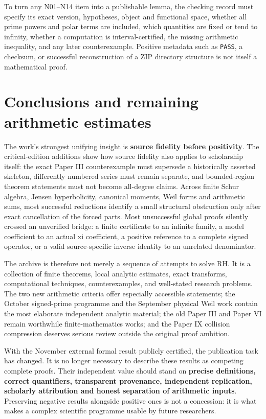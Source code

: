 \documentclass[
  10pt,
  a4paper,
  10pt,
  oneside,
  openany]{book}
\begin{document}
To turn any N01--N14 item into a publishable lemma, the checking record
must specify its exact version, hypotheses, object and functional space,
whether all prime powers and polar terms are included, which quantities
are fixed or tend to infinity, whether a computation is
interval-certified, the missing arithmetic inequality, and any later
counterexample. Positive metadata such as \texttt{PASS}, a checksum, or
successful reconstruction of a ZIP directory structure is not itself a
mathematical proof.

\section{Conclusions and remaining arithmetic
estimates}\label{conclusions-and-remaining-arithmetic-estimates}

The work's strongest unifying insight is \textbf{source fidelity before
positivity}. The critical-edition additions show how source fidelity
also applies to scholarship itself: the exact Paper III counterexample
must supersede a historically asserted skeleton, differently numbered
series must remain separate, and bounded-region theorem statements must
not become all-degree claims. Across finite Schur algebra, Jensen
hyperbolicity, canonical moments, Weil forms and arithmetic sums, most
successful reductions identify a small structural obstruction only after
exact cancellation of the forced parts. Most unsuccessful global proofs
silently crossed an unverified bridge: a finite certificate to an
infinite family, a model coefficient to an actual xi coefficient, a
positive reference to a complete signed operator, or a valid
source-specific inverse identity to an unrelated denominator.

The archive is therefore not merely a sequence of attempts to solve RH.
It is a collection of finite theorems, local analytic estimates, exact
transforms, computational techniques, counterexamples, and well-stated
research problems. The two new arithmetic criteria offer especially
accessible statements; the October signed-prime programme and the
September physical Weil work contain the most elaborate independent
analytic material; the old Paper III and Paper VI remain worthwhile
finite-mathematics works; and the Paper IX collision compression
deserves serious review outside the original proof ambition.

With the November external formal result publicly certified, the
publication task has changed. It is no longer necessary to describe
these results as competing complete proofs. Their independent value
should stand on \textbf{precise definitions, correct quantifiers,
transparent provenance, independent replication, scholarly attribution
and honest separation of arithmetic inputs}. Preserving negative results
alongside positive ones is not a concession: it is what makes a complex
scientific programme usable by future researchers.
\end{document}

